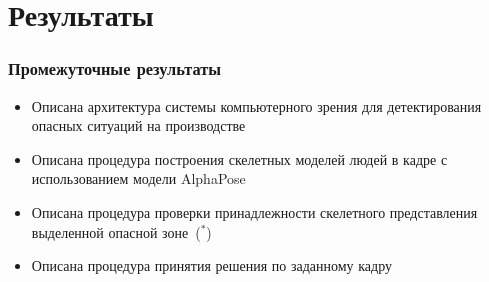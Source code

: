 \section{Результаты}
\begin{frame}
    \frametitle{Промежуточные результаты}
    \begin{itemize}
        \item Описана архитектура системы компьютерного зрения для детектирования опасных ситуаций на производстве
        \item Описана процедура построения скелетных моделей людей в кадре с использованием модели AlphaPose
        \item Описана процедура проверки принадлежности скелетного представления выделенной опасной зоне~($^*$)
        \item Описана процедура принятия решения по заданному кадру
    \end{itemize}
\end{frame}
